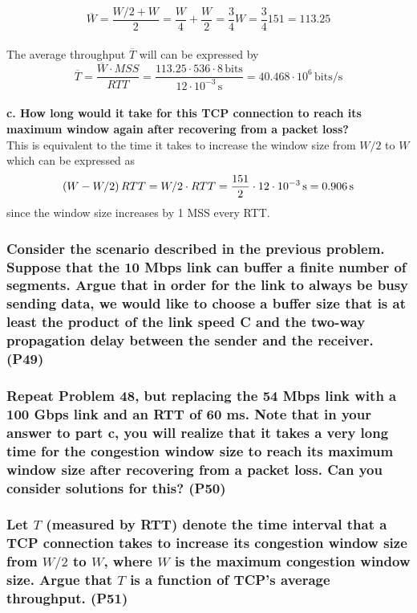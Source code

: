 \begin{equation*}
    \overline{W} = \frac{W/2 + W}{2} = \frac{W}{4} + \frac{W}{2} = \frac{3}{4} W = \frac{3}{4} 151 = 113.25
\end{equation*}
\\
The average throughput $\overline{T}$ will can be expressed by
\begin{equation*}
    \overline{T} = \frac{\overline{W} \cdot MSS}{RTT} = \frac{113.25 \cdot 536 \cdot 8 \, \text{bits}}{12 \cdot 10^{-3} \, \text{s}} = 40.468 \cdot 10^6 \, \text{bits/s}
\end{equation*}
\\
\textbf{c. How long would it take for this TCP connection to reach its maximum window again after recovering from a packet loss?} \\
This is equivalent to the time it takes to increase the window size from $W/2$ to $W$ which can be expressed as
\begin{equation*}
    \left (W - W/2\right) RTT = W/2 \cdot RTT  = \frac{151}{2} \cdot 12 \cdot 10^{-3} \, \text{s} = 0.906 \, \text{s}
\end{equation*}
since the window size increases by 1 MSS every RTT.

\subsubsection{Consider the scenario described in the previous problem. Suppose that the 10 Mbps link can buffer a finite number of segments. Argue that in order for the link to always be busy sending data, we would like to choose a buffer size that is at least the product of the link speed C and the two-way propagation delay between the sender and the receiver. (P49)}


\subsubsection{Repeat Problem 48, but replacing the 54 Mbps link with a 100 Gbps link and an RTT of 60 ms. Note that in your answer to part c, you will realize that it takes a very long time for the congestion window size to reach its maximum window size after recovering from a packet loss. Can you consider solutions for this? (P50)}


\subsubsection{Let $T$ (measured by RTT) denote the time interval that a TCP connection takes to increase its congestion window size from $W/2$ to $W$, where $W$ is the maximum congestion window size. Argue that $T$ is a function of TCP's  average throughput. (P51)}


